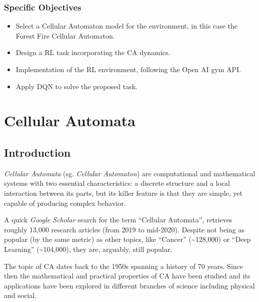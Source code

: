 \documentclass[
  12pt,
  openany]{book}
\providecommand{\tightlist}{%
  \setlength{\itemsep}{0pt}\setlength{\parskip}{0pt}}
\begin{document}
\hypertarget{specific-objectives}{%
\subsection{Specific Objectives}\label{specific-objectives}}

\begin{itemize}
\tightlist
\item
  Select a Cellular Automaton model for the environment, in this case the Forest Fire Cellular Automaton.
\item
  Design a RL task incorporating the CA dynamics.
\item
  Implementation of the RL environment, following the Open AI gym API.
\item
  Apply DQN to solve the proposed task.
\end{itemize}

\hypertarget{cellular-automata}{%
\chapter{Cellular Automata}\label{cellular-automata}}

\hypertarget{introduction-1}{%
\section{Introduction}\label{introduction-1}}

\emph{Cellular Automata} (sg. \emph{Cellular Automaton}) are computational and mathematical systems with two essential characteristics: a discrete structure and a local interaction between its parts, but its killer feature is that they are simple, yet capable of producing complex behavior.

A quick \emph{Google Scholar} search for the term ``Cellular Automata'', retrieves roughly 13,000 research articles (from 2019 to mid-2020). Despite not being as popular (by the same metric) as other topics, like ``Cancer'' (\textasciitilde128,000) or ``Deep Learning'' (\textasciitilde104,000), they are, arguably, still popular.

The topic of CA dates back to the 1950s spanning a history of 70 years. Since then the mathematical and practical properties of CA have been studied and its applications have been explored in different branches of science including physical and social.
\end{document}
